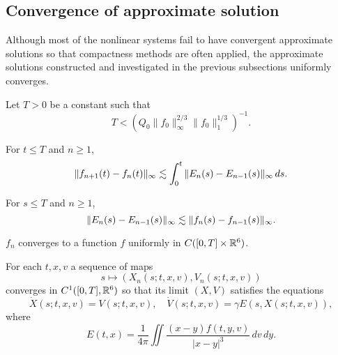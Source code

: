 \documentclass[11pt]{amsart}
\begin{document}
\subsection{Convergence of approximate solution}
Although most of the nonlinear systems fail to have convergent approximate solutions so that compactness methods are often applied, the approximate solutions constructed and investigated in the previous subsections uniformly converges.
\begin{lem}
Let $T>0$ be a constant such that
\[T<(Q_0\|f_0\|_\infty^{2/3}\|f_0\|_1^{1/3})^{-1}.\]
\begin{ol}
\item
For $t\le T$ and $n\ge1$,
\[\|f_{n+1}(t)-f_n(t)\|_\infty\lesssim\int_0^t\|E_n(s)-E_{n-1}(s)\|_\infty\,ds.\]
\item
For $s\le T$ and $n\ge1$,
\[\|E_n(s)-E_{n-1}(s)\|_\infty\lesssim\|f_n(s)-f_{n-1}(s)\|_\infty.\]
\item $f_n$ converges to a function $f$ uniformly in $C([0,T]\times\mathbb{R}^6)$.
\item For each $t,x,v$ a sequence of maps
\[s\mapsto(X_n(s;t,x,v),V_n(s;t,x,v))\]
converges in $C^1([0,T],\mathbb{R}^6)$ so that its limit $(X,V)$ satisfies the equations
\[\dot X(s;t,x,v)=V(s;t,x,v),\quad\dot V(s;t,x,v)=\gamma E(s,X(s;t,x,v)),\]
where
\[E(t,x)=\frac1{4\pi}\iint\frac{(x-y)f(t,y,v)}{|x-y|^3}\,dv\,dy.\]
\end{ol}
\end{lem}
\end{document}
